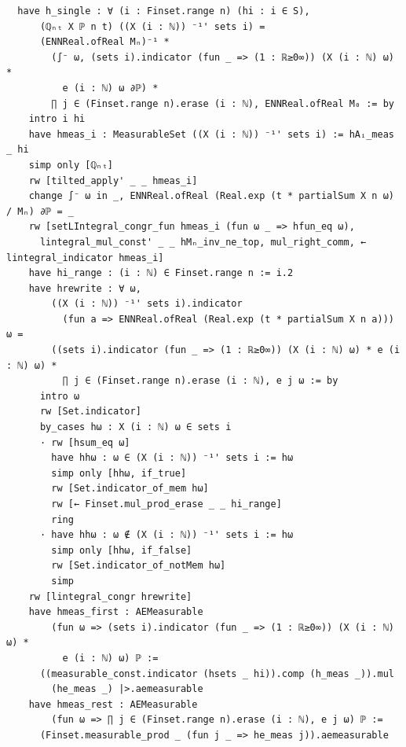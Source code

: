 \newpage
\begin{lstlisting}
  have h_single : ∀ (i : Finset.range n) (hi : i ∈ S),
      (ℚₙₜ X ℙ n t) ((X (i : ℕ)) ⁻¹' sets i) =
      (ENNReal.ofReal Mₙ)⁻¹ *
        (∫⁻ ω, (sets i).indicator (fun _ => (1 : ℝ≥0∞)) (X (i : ℕ) ω) *
          e (i : ℕ) ω ∂ℙ) *
        ∏ j ∈ (Finset.range n).erase (i : ℕ), ENNReal.ofReal M₀ := by
    intro i hi
    have hmeas_i : MeasurableSet ((X (i : ℕ)) ⁻¹' sets i) := hAᵢ_meas _ hi
    simp only [ℚₙₜ]
    rw [tilted_apply' _ _ hmeas_i]
    change ∫⁻ ω in _, ENNReal.ofReal (Real.exp (t * partialSum X n ω) / Mₙ) ∂ℙ = _
    rw [setLIntegral_congr_fun hmeas_i (fun ω _ => hfun_eq ω),
      lintegral_mul_const' _ _ hMₙ_inv_ne_top, mul_right_comm, ← lintegral_indicator hmeas_i]
    have hi_range : (i : ℕ) ∈ Finset.range n := i.2
    have hrewrite : ∀ ω,
        ((X (i : ℕ)) ⁻¹' sets i).indicator
          (fun a => ENNReal.ofReal (Real.exp (t * partialSum X n a))) ω =
        ((sets i).indicator (fun _ => (1 : ℝ≥0∞)) (X (i : ℕ) ω) * e (i : ℕ) ω) *
          ∏ j ∈ (Finset.range n).erase (i : ℕ), e j ω := by
      intro ω
      rw [Set.indicator]
      by_cases hω : X (i : ℕ) ω ∈ sets i
      · rw [hsum_eq ω]
        have hhω : ω ∈ (X (i : ℕ)) ⁻¹' sets i := hω
        simp only [hhω, if_true]
        rw [Set.indicator_of_mem hω]
        rw [← Finset.mul_prod_erase _ _ hi_range]
        ring
      · have hhω : ω ∉ (X (i : ℕ)) ⁻¹' sets i := hω
        simp only [hhω, if_false]
        rw [Set.indicator_of_notMem hω]
        simp
    rw [lintegral_congr hrewrite]
    have hmeas_first : AEMeasurable
        (fun ω => (sets i).indicator (fun _ => (1 : ℝ≥0∞)) (X (i : ℕ) ω) *
          e (i : ℕ) ω) ℙ :=
      ((measurable_const.indicator (hsets _ hi)).comp (h_meas _)).mul
        (he_meas _) |>.aemeasurable
    have hmeas_rest : AEMeasurable
        (fun ω => ∏ j ∈ (Finset.range n).erase (i : ℕ), e j ω) ℙ :=
      (Finset.measurable_prod _ (fun j _ => he_meas j)).aemeasurable
\end{lstlisting}
\newpage
